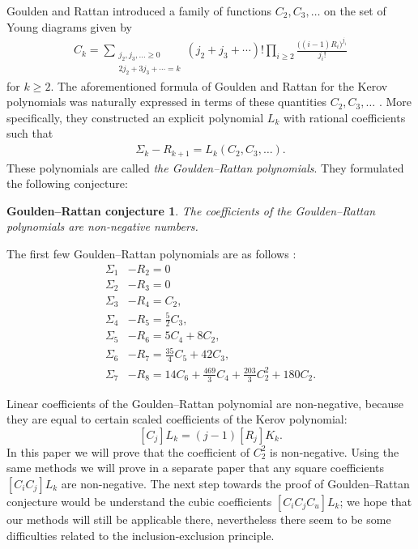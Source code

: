 \documentclass[submission]{FPSAC2021}
\newtheorem*{conjecture}{Goulden--Rattan conjecture}
\begin{document}
Goulden and Rattan \cite{GR05} introduced a family of functions 
$C_2,C_3,\dots$ on the set of Young diagrams given by
\begin{align}
\label{cformula}
C_k=\sum_{\substack{j_2,j_3,\ldots \geq 0 \\ 2j_2+3j_3+\cdots=k}}
(j_2+j_3+\cdots)!\prod_{i\geq 2} \frac{\big( (i-1)R_i\big)^{j_i}}{j_i!}
\end{align}
for $k\geq 2$.
The aforementioned formula of Goulden and Rattan for the Kerov polynomials 
was naturally expressed in terms of these 
quantities $C_2,C_3,\dots$ \cite{GR05}. 
More specifically, they constructed an explicit polynomial $L_k$ with
rational coefficients such that 
\begin{align}
\label{grpol}
\Sigma_k-R_{k+1}=L_k(C_2, C_3, \ldots).
\end{align}
These polynomials are called \emph{the Goulden--Rattan polynomials}. They formulated the following conjecture:
\begin{conjecture}
\label{hipotezaGR}
The coefficients of the Goulden--Rattan polynomials are non-negative numbers. 
\end{conjecture}
The first few Goulden--Rattan polynomials are as follows \cite{GR05}:
\begin{align*}
\Sigma_1&-R_2=0\\
\Sigma_2&-R_3=0\\
\Sigma_3&-R_4=C_2,\\
\Sigma_4&-R_5=\frac{5}{2}C_3,\\
\Sigma_5&-R_6=5C_4+8C_2,\\
\Sigma_6&-R_7=\frac{35}{4}C_5+42C_3,\\
\Sigma_7&-R_8=14C_6+\frac{469}{3}C_4+\frac{203}{3}C_2^2+180C_2.
\end{align*}

Linear coefficients of the Goulden--Rattan polynomial are non-negative, because
they are equal to certain scaled coefficients of the Kerov polynomial:
\[ [ C_j ] L_k=(j-1) [ R_j ] K_k. \]
In this
paper we will prove that the coefficient of $C_2^2$ is non-negative.
Using the same methods we will prove in a separate paper \cite{Mar21} that 
any square coefficients $[ C_i C_j ] L_k$ are non-negative. 
The next step towards the proof of Goulden--Rattan conjecture would be understand 
the cubic coefficients $ [ C_i C_j C_u ] L_k$; we hope that 
our methods will still be applicable there, nevertheless there seem to be 
some difficulties related to the inclusion-exclusion principle.
\end{document}
